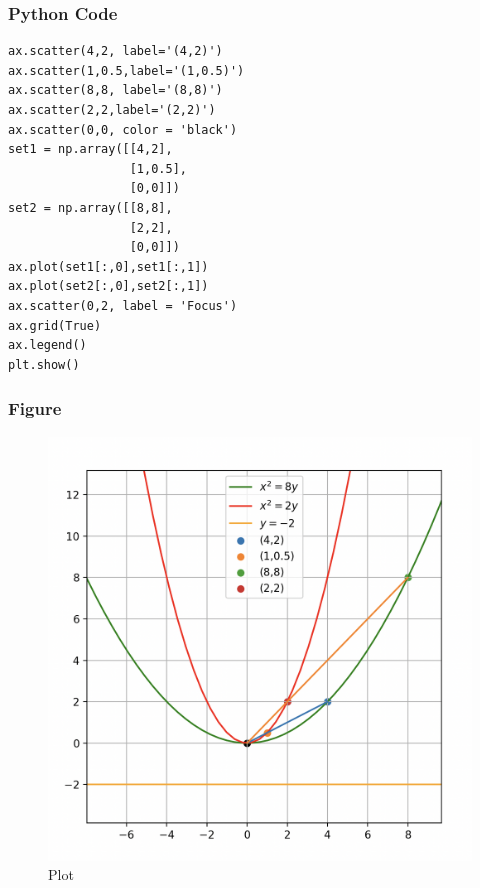 \documentclass{beamer}
\begin{document}
\begin{frame}[fragile]
    \frametitle{Python Code}
    \begin{lstlisting}
ax.scatter(4,2, label='(4,2)')
ax.scatter(1,0.5,label='(1,0.5)')
ax.scatter(8,8, label='(8,8)')
ax.scatter(2,2,label='(2,2)')
ax.scatter(0,0, color = 'black')
set1 = np.array([[4,2],
                 [1,0.5],
                 [0,0]])
set2 = np.array([[8,8],
                 [2,2],
                 [0,0]])
ax.plot(set1[:,0],set1[:,1])
ax.plot(set2[:,0],set2[:,1])
ax.scatter(0,2, label = 'Focus')
ax.grid(True)
ax.legend()
plt.show()
\end{lstlisting}
\end{frame}

\begin{frame}[fragile]
    \frametitle{Figure}
\begin{figure}[H]
    \centering
    \includegraphics[width=0.6\columnwidth]{847.png}
    \caption{Plot}
    \label{fig:placeholder}
\end{figure}
\end{frame}
\end{document}
